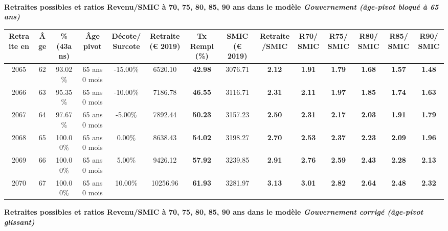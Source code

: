  ~\\{\bf \noindent Retraites possibles et ratios Revenu/SMIC à 70, 75, 80, 85, 90 ans dans le modèle \emph{Gouvernement (âge-pivot bloqué à 65 ans)}}  
 
\begin{adjustbox}{max width=\textwidth} 
\begin{tabular}[htb]{|c|c||c|c|c||c|c||c|c||c|c|c|c|c|} 
\hline 
 Retraite en &  Âge &  \%(43ans) &  Âge pivot &  Décote/Surcote &  Retraite (\euro{} 2019) &  Tx Rempl(\%) &  SMIC (\euro{} 2019) &  Retraite/SMIC &  R70/SMIC &  R75/SMIC &  R80/SMIC &  R85/SMIC &  R90/SMIC \\ 
\hline \hline 
 2065 &  62 &  93.02\% &  65 ans 0 mois &  -15.00\% &  6520.10 &  {\bf 42.98} &  3076.71 &  {\bf 2.12} &  {\bf 1.91} &  {\bf 1.79} &  {\bf 1.68} &  {\bf 1.57} &  {\bf 1.48} \\ 
\hline 
 2066 &  63 &  95.35\% &  65 ans 0 mois &  -10.00\% &  7186.78 &  {\bf 46.55} &  3116.71 &  {\bf 2.31} &  {\bf 2.11} &  {\bf 1.97} &  {\bf 1.85} &  {\bf 1.74} &  {\bf 1.63} \\ 
\hline 
 2067 &  64 &  97.67\% &  65 ans 0 mois &  -5.00\% &  7892.44 &  {\bf 50.23} &  3157.23 &  {\bf 2.50} &  {\bf 2.31} &  {\bf 2.17} &  {\bf 2.03} &  {\bf 1.91} &  {\bf 1.79} \\ 
\hline 
 2068 &  65 &  100.00\% &  65 ans 0 mois &  0.00\% &  8638.43 &  {\bf 54.02} &  3198.27 &  {\bf 2.70} &  {\bf 2.53} &  {\bf 2.37} &  {\bf 2.23} &  {\bf 2.09} &  {\bf 1.96} \\ 
\hline 
 2069 &  66 &  100.00\% &  65 ans 0 mois &  5.00\% &  9426.12 &  {\bf 57.92} &  3239.85 &  {\bf 2.91} &  {\bf 2.76} &  {\bf 2.59} &  {\bf 2.43} &  {\bf 2.28} &  {\bf 2.13} \\ 
\hline 
 2070 &  67 &  100.00\% &  65 ans 0 mois &  10.00\% &  10256.96 &  {\bf 61.93} &  3281.97 &  {\bf 3.13} &  {\bf 3.01} &  {\bf 2.82} &  {\bf 2.64} &  {\bf 2.48} &  {\bf 2.32} \\ 
\hline 
\hline 
\end{tabular} 
\end{adjustbox} 
 
 \vspace{0.1cm} 
{\bf \noindent Retraites possibles et ratios Revenu/SMIC à 70, 75, 80, 85, 90 ans dans le modèle \emph{Gouvernement corrigé (âge-pivot glissant)}}  
 

